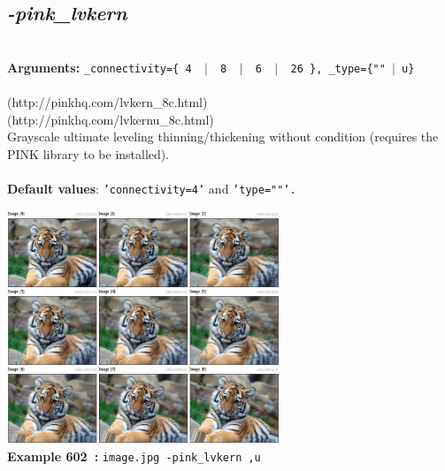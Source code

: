 \documentclass[a4paper,11pt,twoside]{book}
\begin{document}
\subsection{\emph{-pink\_lvkern} }\vspace*{-0.5em}
~\\\textbf{Arguments: } 
{\small \texttt{\_connectivity=\{ 4 ~$|$~ 8 ~$|$~ 6 ~$|$~ 26 \}, \_type=\{""~$|$~u\}}}\\~\\
(http://pinkhq.com/lvkern\_8c.html)
~\\(http://pinkhq.com/lvkernu\_8c.html)
~\\Grayscale ultimate leveling thinning/thickening without condition (requires the PINK library to be installed).
~\\~\\\textbf{Default values}: {\small \texttt{'connectivity=4'} and \texttt{'type=""'.}}
\begin{center}\includegraphics[keepaspectratio=true,height=7cm,width=\textwidth]{img/gmic_def602.jpg}\\
{\footnotesize \textbf{Example 602~:} \texttt{image.jpg -pink\_lvkern ,u}}
\end{center}
\end{document}
